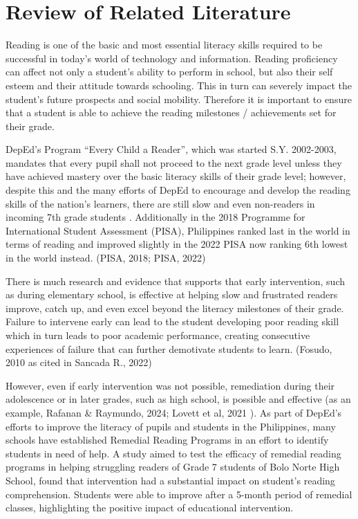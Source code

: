 \chapter{Review of Related Literature}
\label{sec:relatedlit}

Reading is one of the basic and most essential literacy skills required to be successful in today’s world of technology and information. Reading proficiency can affect not only a student’s ability to perform in school, but also their self esteem and their attitude towards schooling. This in turn can severely impact the student’s future prospects and social mobility. Therefore it is important to ensure that a student is able to achieve the reading milestones / achievements set for their grade. 

DepEd’s Program “Every Child a Reader”, which was started S.Y. 2002-2003, mandates that every pupil shall not proceed to the next grade level unless they have achieved mastery over the basic literacy skills of their grade level; however, despite this and the many efforts of DepEd to encourage and develop the reading skills of the nation’s learners, there are still slow and even non-readers in incoming 7th grade students \cite{Sancada_2022}. Additionally in the 2018 Programme for International Student Assessment (PISA), Philippines ranked last in the world in terms of reading and improved slightly in the 2022 PISA now ranking 6th lowest in the world instead. (PISA, 2018; PISA, 2022)

There is much research and evidence that supports that early intervention, such as during elementary school, is effective at helping slow and frustrated readers improve, catch up, and even excel beyond the literacy milestones of their grade. \cite{Lee_Gable_Klassen_2012} Failure to intervene early can lead to the student developing poor reading skill which in turn leads to poor academic performance, creating consecutive experiences of failure that can further demotivate students to learn. (Fosudo, 2010 as cited in Sancada R., 2022)

However, even if early intervention was not possible, remediation during their adolescence or in later grades, such as high school, is possible and effective (as an example, Rafanan \& Raymundo, 2024; Lovett et al, 2021 \nocite{Rafanan_Raymundo_2024} \nocite{Lovett_Frijters_Steinbach_Sevcik_Morris_2021}). As part of DepEd’s efforts to improve the literacy of pupils and students in the Philippines, many schools have established Remedial Reading Programs in an effort to identify students in need of help. A study aimed to test the efficacy of remedial reading programs in helping struggling readers of Grade 7 students of Bolo Norte High School, found that intervention had a substantial impact on student’s reading comprehension. Students were able to improve after a 5-month period of remedial classes, highlighting the positive impact of educational intervention. \cite{Abergos_Cruz_Lasala_Prado_Tapar_Cañeza_Ocampo_2024}

